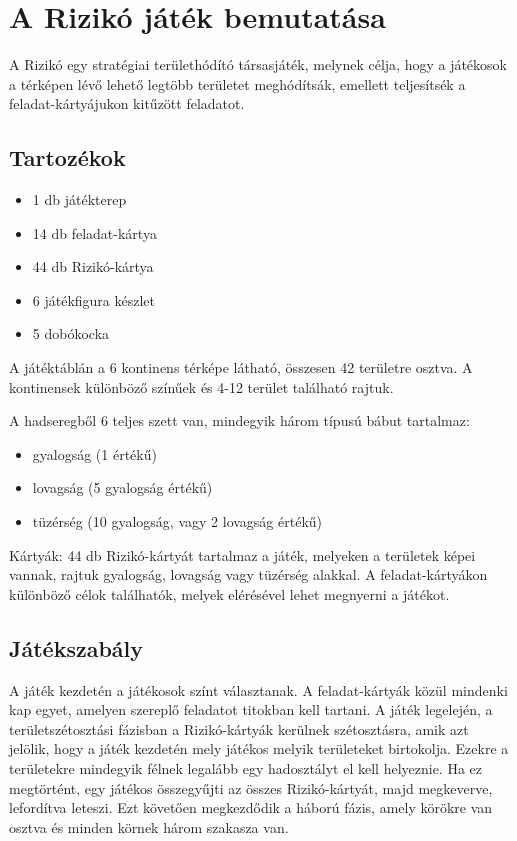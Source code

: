 \section{A Rizikó játék bemutatása}

A Rizikó egy stratégiai területhódító társasjáték, melynek célja, hogy a játékosok a térképen lévő lehető legtöbb területet meghódítsák, emellett teljesítsék a feladat-kártyájukon kitűzött feladatot.\cite{riziko}


\subsection*{Tartozékok}
\begin{itemize}
\item 1 db játékterep 
\item 14 db feladat-kártya 
\item 44 db Rizikó-kártya 
\item 6 játékfigura készlet 
\item 5 dobókocka 
\end{itemize}

A játéktáblán a 6 kontinens térképe látható, összesen 42 területre osztva.
A kontinensek különböző színűek és 4-12 terület található rajtuk.

A hadseregből 6 teljes szett van, mindegyik három típusú bábut tartalmaz:
\begin{itemize}
\item gyalogság (1 értékű) 
\item lovagság (5 gyalogság értékű) 
\item tüzérség (10 gyalogság, vagy 2 lovagság értékű)
\end{itemize}

Kártyák: 44 db Rizikó-kártyát tartalmaz a játék, melyeken a területek képei vannak, rajtuk gyalogság, lovagság vagy tüzérség alakkal.
A feladat-kártyákon különböző célok találhatók, melyek elérésével lehet megnyerni a játékot.

\subsection*{Játékszabály}

A játék kezdetén a játékosok színt választanak.
A feladat-kártyák közül mindenki kap egyet, amelyen szereplő feladatot titokban kell tartani.
A játék legelején, a területszétosztási fázisban a Rizikó-kártyák kerülnek szétosztásra, amik azt jelölik, hogy a játék kezdetén mely játékos melyik területeket birtokolja.
Ezekre a területekre mindegyik félnek legalább egy hadosztályt el kell helyeznie.
Ha ez megtörtént, egy játékos összegyűjti az összes Rizikó-kártyát, majd megkeverve, lefordítva leteszi.
Ezt követően megkezdődik a háború fázis, amely körökre van osztva és minden körnek három szakasza van.

